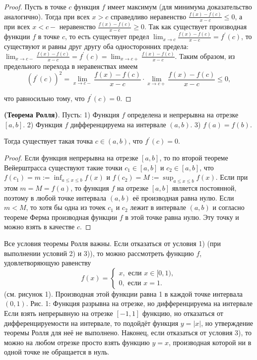 \begin{proof}
    Пусть в точке $c$ функция $f$ имеет максимум (для минимума доказательство аналогично). Тогда при всех $x>c$ справедливо неравенство $\frac{f(x)-f(c)}{x-c} \leq 0$, а при всех $x<c-$ неравенство $\frac{f(x)-f(c)}{x-c} \geq 0$. Так как существует производная функции $f$ в точке $c$, то есть существует предел $\lim _{x \rightarrow c} \frac{f(x)-f(c)}{x-c}=f^{\prime}(c)$, то существуют и равны друг другу оба односторонних предела: $\lim _{x \rightarrow c-} \frac{f(x)-f(c)}{x-c}=f^{\prime}(c)=\lim _{x \rightarrow c+} \frac{f(x)-f(c)}{x-c}$. Таким образом, из предельного перехода в неравенствах имеем
    $$
        \left(f^{\prime}(c)\right)^2=\lim _{x \rightarrow c-} \frac{f(x)-f(c)}{x-c} \cdot \lim _{x \rightarrow c+} \frac{f(x)-f(c)}{x-c} \leq 0,
    $$

    что равносильно тому, что $f^{\prime}(c)=0$.
\end{proof}

\begin{theorem} \textbf{(Теорема Ролля)}.
    Пусть:
    1) Функция $f$ определена и непрерывна на отрезке $[a, b]$.
    2) Функция $f$ дифференцируема на интервале $(a, b)$.
    3) $f(a)=f(b)$.

    Тогда существует такая точка $c \in(a, b)$, что $f^{\prime}(c)=0$.
\end{theorem}

\begin{proof}
    Если функция непрерывна на отрезке $[a, b]$, то по второй теореме Вейерштрасса существуют такие точки $c_1 \in[a, b]$ и $c_2 \in[a, b]$, что $f\left(c_1\right)=m:=\inf _{a \leq x \leq b} f(x)$ и $f\left(c_2\right)=M:=\sup _{a \leq x \leq b} f(x)$. Если при этом $m=M=f(a)$, то функция $f$ на отрезке $[a, b]$ является постоянной, поэтому в любой точке интервала $(a, b)$ её производная равна нулю. Если $m<M$, то хотя бы одна из точек $c_1$ и $c_2$ лежит в интервале $(a, b)$ и согласно теореме Ферма производная функции $f$ в этой точке равна нулю. Эту точку и можно взять в качестве $c$.
\end{proof}

Все условия теоремы Ролля важны. Если отказаться от условия 1) (при выполнении условий 2) и 3)), то можно рассмотреть функцию $f$, удовлетворяющую равенству
$$
    f(x)=\left\{\begin{array}{l}
        x, \text { если } x \in[0,1), \\
        0, \text { если } x=1 .
    \end{array}\right.
$$
(см. рисунок 1). Производная этой функции равна 1 в каждой точке интервала $(0,1)$.
Рис. 1: Функция разрывна на отрезке, но дифференцируема на интервале
Если взять непрерывную на отрезке $[-1,1]$ функцию, но отказаться от дифференцируемости на интервале, то подойдёт функция $y=|x|$, но утверждение теоремы Ролля для неё не выполнено. Наконец, если отказаться от условия 3), то можно на любом отрезке просто взять функцию $y=x$, производная которой ни в одной точке не обращается в нуль.
\newpage

